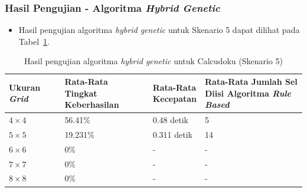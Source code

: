\documentclass{beamer}
\begin{document}
\begin{frame}
\frametitle{Hasil Pengujian - Algoritma \textit{Hybrid Genetic}}
\begin{itemize}
\item Hasil pengujian algoritma \textit{hybrid genetic} untuk Skenario 5 dapat dilihat pada Tabel~\ref{tab:pengujianhg5}.
\end{itemize}
\begin{table}
\tiny
\centering
\captionsetup{justification=centering}
\caption[Hasil pengujian algoritma \textit{hybrid genetic} untuk Calcudoku (Skenario 5)]{Hasil pengujian algoritma \textit{hybrid genetic} untuk Calcudoku (Skenario 5)}
\begin{tabular}{| l | l | l | l |}
\hline
Ukuran \textit{Grid} & \makecell[c]{Rata-Rata \\ Tingkat Keberhasilan} & \makecell[c]{Rata-Rata \\ Kecepatan} & \makecell[c]{Rata-Rata Jumlah Sel \\ Diisi Algoritma \textit{Rule Based}} \\
\hline \hline
\begin{math}4 \times 4\end{math} & 56.41\% & 0.48 detik & 5 \\
\hline
\begin{math}5 \times 5\end{math} & 19.231\% & 0.311 detik & 14 \\
\hline
\begin{math}6 \times 6\end{math} & 0\% & - & - \\
\hline
\begin{math}7 \times 7\end{math} & 0\% & - & - \\
\hline
\begin{math}8 \times 8\end{math} & 0\% & - & - \\
\hline
\end{tabular}
\label{tab:pengujianhg5}
\end{table}
\end{frame}

\end{document}
